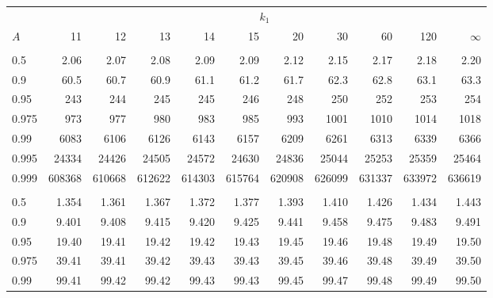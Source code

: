\documentclass[]{article}
\begin{document}
\begin{table}[H]
\centering
\begin{tabular}{lrrrrrrrrrr}
\toprule
\multicolumn{1}{c}{ } & \multicolumn{10}{c}{$k_1$} \\
\cmidrule(l{3pt}r{3pt}){2-11}
\hspace{1.1em}$A$ & 11 & 12 & 13 & 14 & 15 & 20 & 30 & 60 & 120 & $\infty$\\
\midrule
\addlinespace[0.3em]
\multicolumn{11}{l}{\textbf{$k_2=1$}}\\
\hspace{1em}0.5 & 2.06 & 2.07 & 2.08 & 2.09 & 2.09 & 2.12 & 2.15 & 2.17 & 2.18 & 2.20\\
\hspace{1em}0.9 & 60.5 & 60.7 & 60.9 & 61.1 & 61.2 & 61.7 & 62.3 & 62.8 & 63.1 & 63.3\\
\hspace{1em}0.95 & 243 & 244 & 245 & 245 & 246 & 248 & 250 & 252 & 253 & 254\\
\hspace{1em}0.975 & 973 & 977 & 980 & 983 & 985 & 993 & 1001 & 1010 & 1014 & 1018\\
\hspace{1em}0.99 & 6083 & 6106 & 6126 & 6143 & 6157 & 6209 & 6261 & 6313 & 6339 & 6366\\
\hspace{1em}0.995 & 24334 & 24426 & 24505 & 24572 & 24630 & 24836 & 25044 & 25253 & 25359 & 25464\\
\hspace{1em}0.999 & 608368 & 610668 & 612622 & 614303 & 615764 & 620908 & 626099 & 631337 & 633972 & 636619\\
\addlinespace[0.3em]
\multicolumn{11}{l}{\textbf{$k_2=2$}}\\
\hspace{1em}0.5 & 1.354 & 1.361 & 1.367 & 1.372 & 1.377 & 1.393 & 1.410 & 1.426 & 1.434 & 1.443\\
\hspace{1em}0.9 & 9.401 & 9.408 & 9.415 & 9.420 & 9.425 & 9.441 & 9.458 & 9.475 & 9.483 & 9.491\\
\hspace{1em}0.95 & 19.40 & 19.41 & 19.42 & 19.42 & 19.43 & 19.45 & 19.46 & 19.48 & 19.49 & 19.50\\
\hspace{1em}0.975 & 39.41 & 39.41 & 39.42 & 39.43 & 39.43 & 39.45 & 39.46 & 39.48 & 39.49 & 39.50\\
\hspace{1em}0.99 & 99.41 & 99.42 & 99.42 & 99.43 & 99.43 & 99.45 & 99.47 & 99.48 & 99.49 & 99.50\\

\end{tabular}
\end{table}
\end{document}

